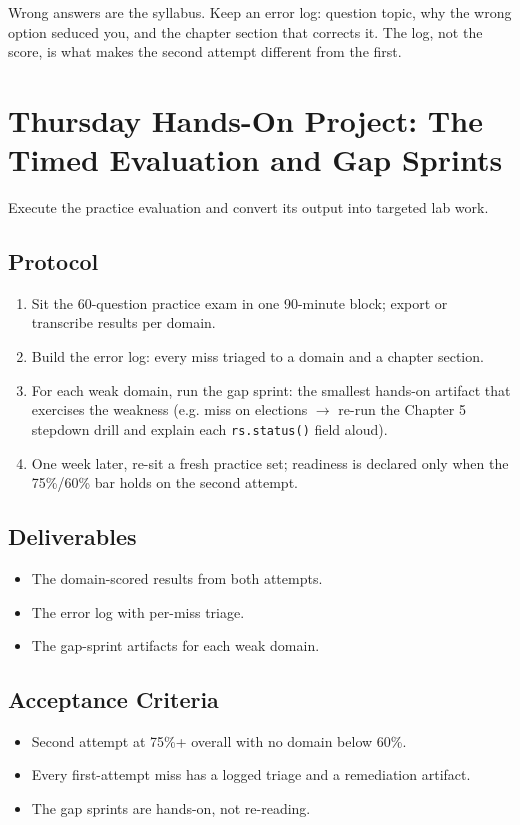 \begin{tipbox}
Wrong answers are the syllabus. Keep an error log: question topic, why the wrong option seduced you, and the chapter section that corrects it. The log, not the score, is what makes the second attempt different from the first.
\end{tipbox}

\section{Thursday Hands-On Project: The Timed Evaluation and Gap Sprints}
Execute the practice evaluation and convert its output into targeted lab work.

\subsection{Protocol}
\begin{enumerate}
    \item Sit the 60-question practice exam in one 90-minute block; export or transcribe results per domain.
    \item Build the error log: every miss triaged to a domain and a chapter section.
    \item For each weak domain, run the gap sprint: the smallest hands-on artifact that exercises the weakness (e.g. miss on elections $\to$ re-run the Chapter 5 stepdown drill and explain each \texttt{rs.status()} field aloud).
    \item One week later, re-sit a fresh practice set; readiness is declared only when the 75\%/60\% bar holds on the second attempt.
\end{enumerate}

\subsection*{Deliverables}
\begin{itemize}
    \item The domain-scored results from both attempts.
    \item The error log with per-miss triage.
    \item The gap-sprint artifacts for each weak domain.
\end{itemize}

\subsection*{Acceptance Criteria}
\begin{itemize}
    \item Second attempt at 75\%+ overall with no domain below 60\%.
    \item Every first-attempt miss has a logged triage and a remediation artifact.
    \item The gap sprints are hands-on, not re-reading.
\end{itemize}

